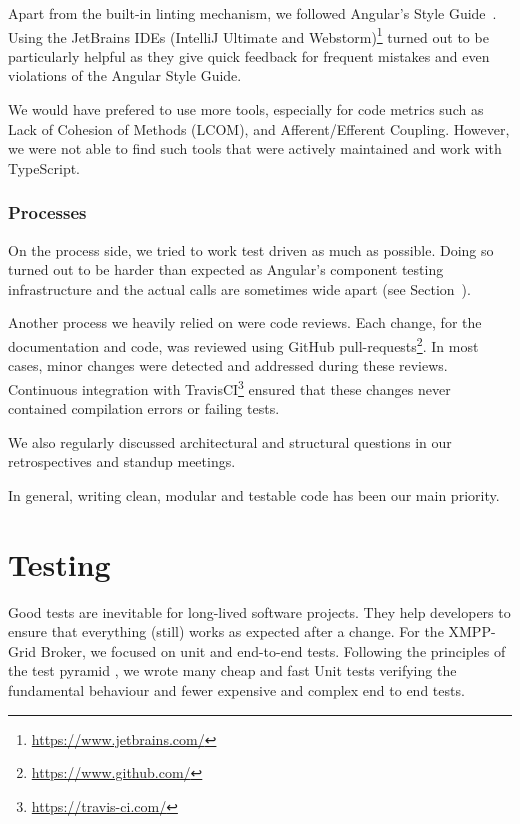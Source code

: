 Apart from the built-in linting mechanism, we followed Angular's Style Guide~\cite{angular-style-guide}.
Using the JetBrains IDEs (IntelliJ Ultimate and Webstorm)\footnote{\url{https://www.jetbrains.com/}} turned out to be particularly helpful as they give quick feedback for frequent mistakes and even violations of the Angular Style Guide.

We would have prefered to use more tools, especially for code metrics such as Lack of Cohesion of Methods (LCOM), and Afferent/Efferent Coupling.
However, we were not able to find such tools that were actively maintained and work with TypeScript.

\subsubsection{Processes}

On the process side, we tried to work test driven as much as possible.
Doing so turned out to be harder than expected as Angular's component testing infrastructure and the actual calls are sometimes wide apart (see Section~).

Another process we heavily relied on were code reviews.
Each change, for the documentation and code, was reviewed using GitHub pull-requests\footnote{\url{https://www.github.com/}}.
In most cases, minor changes were detected and addressed during these reviews.
Continuous integration with TravisCI\footnote{\url{https://travis-ci.com/}} ensured that these changes never contained compilation errors or failing tests.

We also regularly discussed architectural and structural questions in our retrospectives and standup meetings.

In general, writing clean, modular and testable code has been our main priority.

\section{Testing}\label{sec:testing}

Good tests are inevitable for long-lived software projects.
They help developers to ensure that everything (still) works as expected after a change.
For the XMPP-Grid Broker, we focused on unit and end-to-end tests.
Following the principles of the test pyramid \cite{Cohn:2009:SAS:1667109}, we wrote many cheap and fast Unit tests verifying the fundamental behaviour and fewer expensive and complex end to end tests.


